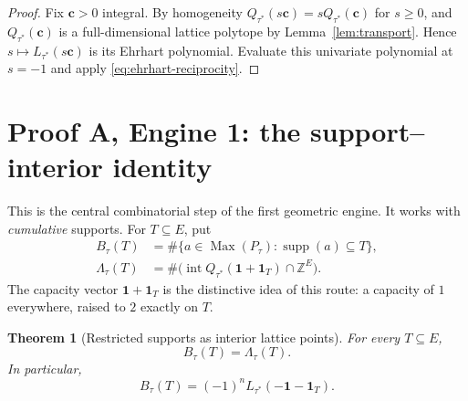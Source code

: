 \documentclass[11pt]{article}
\numberwithin{equation}{section}
\newtheorem{theorem}{Theorem}[section]
\theoremstyle{definition}
\theoremstyle{remark}
\newcommand{\Z}{\mathbb Z}
\newcommand{\one}{\mathbf 1}
\newcommand{\supp}{\operatorname{supp}}
\newcommand{\Max}{\operatorname{Max}}
\newcommand{\Int}{\operatorname{int}}
\begin{document}
\begin{proof}
Fix $\mathbf c>0$ integral. By homogeneity $Q_{\tau^*}(s\mathbf c)
=sQ_{\tau^*}(\mathbf c)$ for $s\ge0$, and $Q_{\tau^*}(\mathbf c)$ is a
full-dimensional lattice polytope by Lemma~\ref{lem:transport}. Hence
$s\mapsto L_{\tau^*}(s\mathbf c)$ is its Ehrhart polynomial. Evaluate this
univariate polynomial at $s=-1$ and apply
\eqref{eq:ehrhart-reciprocity}.
\end{proof}

\section{Proof A, Engine 1: the support--interior identity}
\label{sec:interior}

This is the central combinatorial step of the first geometric engine. It works
with \emph{cumulative} supports. For $T\subseteq E$, put
\begin{align}
 B_\tau(T)&=\#\{a\in\Max(P_\tau):\supp(a)\subseteq T\},
 \label{eq:contained-B}\\
 \Lambda_\tau(T)&=\#\bigl(\Int Q_{\tau^*}(\one+\one_T)\cap\Z^E\bigr).
 \label{eq:interior-N}
\end{align}
The capacity vector $\one+\one_T$ is the distinctive idea of this route: a
capacity of $1$ everywhere, raised to $2$ exactly on $T$.

\begin{theorem}[Restricted supports as interior lattice points]
\label{thm:interior}
For every $T\subseteq E$,
\begin{equation}
 \boxed{B_\tau(T)=\Lambda_\tau(T).}
 \label{eq:interior-identity}
\end{equation}
In particular,
\begin{equation}
 B_\tau(T)=(-1)^nL_{\tau^*}(-\one-\one_T).
 \label{eq:restricted-negative}
\end{equation}
\end{theorem}
\end{document}
